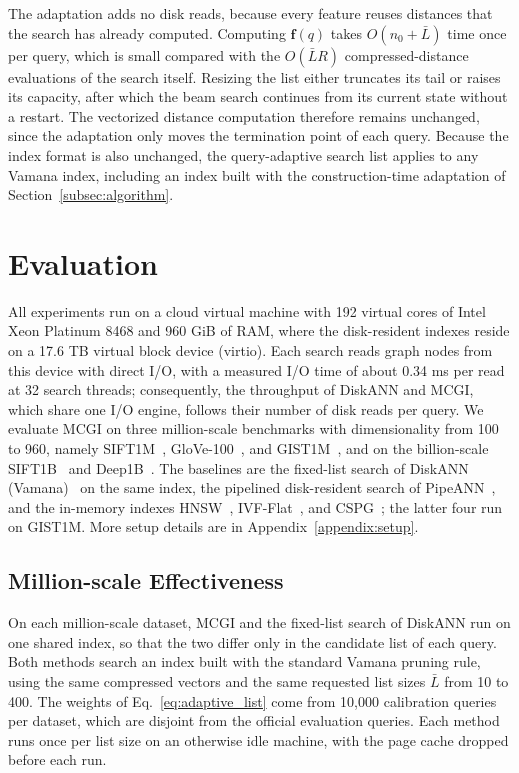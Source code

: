 \documentclass{article}
\theoremstyle{plain}
\theoremstyle{definition}
\theoremstyle{remark}
\newcommand{\ours}{MCGI\xspace}
\begin{document}
The adaptation adds no disk reads, because every feature reuses distances that the search has already computed. Computing $\mathbf{f}(q)$ takes $O(n_0 + \bar{L})$ time once per query, which is small compared with the $O(\bar{L} R)$ compressed-distance evaluations of the search itself. Resizing the list either truncates its tail or raises its capacity, after which the beam search continues from its current state without a restart. The vectorized distance computation therefore remains unchanged, since the adaptation only moves the termination point of each query. Because the index format is also unchanged, the query-adaptive search list applies to any Vamana index, including an index built with the construction-time adaptation of Section~\ref{subsec:algorithm}.

\section{Evaluation}
\label{sec:experiments}

All experiments run on a cloud virtual machine with 192 virtual cores of Intel Xeon Platinum 8468 and 960 GiB of RAM, where the disk-resident indexes reside on a 17.6 TB virtual block device (virtio). Each search reads graph nodes from this device with direct I/O, with a measured I/O time of about 0.34 ms per read at 32 search threads; consequently, the throughput of DiskANN and \ours{}, which share one I/O engine, follows their number of disk reads per query. We evaluate \ours{} on three million-scale benchmarks with dimensionality from 100 to 960, namely SIFT1M~\cite{jegou2011product}, GloVe-100~\cite{pennington2014glove}, and GIST1M~\cite{jegou2011product}, and on the billion-scale SIFT1B~\cite{jegou2011searching} and Deep1B~\cite{babenko2016efficient}. The baselines are the fixed-list search of DiskANN (Vamana)~\cite{subramanya2019diskann} on the same index, the pipelined disk-resident search of PipeANN~\cite{osdi25pipeann}, and the in-memory indexes HNSW~\cite{malkov2018efficient}, IVF-Flat~\cite{johnson2019billion}, and CSPG~\cite{NEURIPS2024_bab1486c}; the latter four run on GIST1M. More setup details are in Appendix~\ref{appendix:setup}.

\subsection{Million-scale Effectiveness}

On each million-scale dataset, \ours{} and the fixed-list search of DiskANN run on one shared index, so that the two differ only in the candidate list of each query. Both methods search an index built with the standard Vamana pruning rule, using the same compressed vectors and the same requested list sizes $\bar{L}$ from 10 to 400. The weights of Eq.~\eqref{eq:adaptive_list} come from 10{,}000 calibration queries per dataset, which are disjoint from the official evaluation queries. Each method runs once per list size on an otherwise idle machine, with the page cache dropped before each run.
\end{document}
